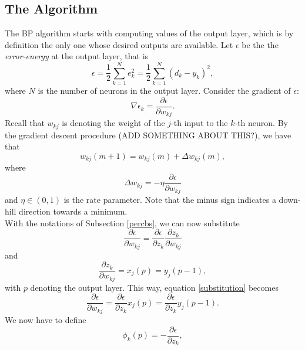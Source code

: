 \documentclass[%
    corpo=11pt,
    twoside,
    stile=classica,
    oldstyle,
    autoretitolo,
    tipotesi=magistrale,
    greek,
    evenboxes,
    english
]{toptesi}
\begin{document}
\subsection{The Algorithm}
The BP algorithm starts with computing values of the output layer, which is by definition the only one whose desired outputs are available. Let $\epsilon$ be the the \textit{error-energy} at the output layer, that is
\begin{equation}
\label{errorenergy}
\epsilon = \frac{1}{2}\sum_{k=1}^{N}e_k^2  =\frac{1}{2}\sum_{k=1}^{N}\left(d_k - y_k\right)^2,
\end{equation}
where $N$ is the number of neurons in the output layer. Consider the gradient of $\epsilon$:
\begin{equation}
\nabla \epsilon_k = \frac{\partial \epsilon}{\partial w_{kj}}.
\end{equation}
Recall that $w_{kj}$ is denoting the weight of the $j$-th input to the $k$-th neuron. By the gradient descent procedure (ADD SOMETHING ABOUT THIS?), we have that 
\begin{equation}
w_{kj}(m+1) = w_{kj}(m) + \Delta w_{kj}(m),
\end{equation}
where 
\begin{equation}
\label{deltasub}
\Delta w_{kj} = -\eta \frac{\partial \epsilon}{\partial w_{kj}}
\end{equation}
and $\eta \in \left(0,1 \right)$ is the rate parameter. Note that the minus sign indicates a down-hill direction towards a minimum. \\
With the notations of Subsection \ref{percbs}, we can now substitute 
\begin{equation}
\label{substitution}
\frac{\partial \epsilon}{\partial w_{kj}} = \frac{\partial \epsilon}{\partial z_k} \frac{\partial z_k}{\partial w_{kj}}
\end{equation}
and 
\begin{equation}
\label{graupe6p8}
\frac{\partial z_k}{\partial w_{kj}} = x_j(p) = y_j(p -1),
\end{equation}
with $p$ denoting the output layer. This way, equation \eqref{substitution} becomes 
\begin{equation}
\label{newsubstitution}
\frac{\partial \epsilon}{\partial w_{kj}} = \frac{\partial \epsilon}{\partial z_k}x_j(p) = \frac{\partial \epsilon}{\partial z_k} y_j(p-1).
\end{equation}
We now have to define 
\begin{equation}
\label{phisub}
\phi_k(p) = - \frac{\partial \epsilon}{\partial z_k},
\end{equation}
\end{document}
